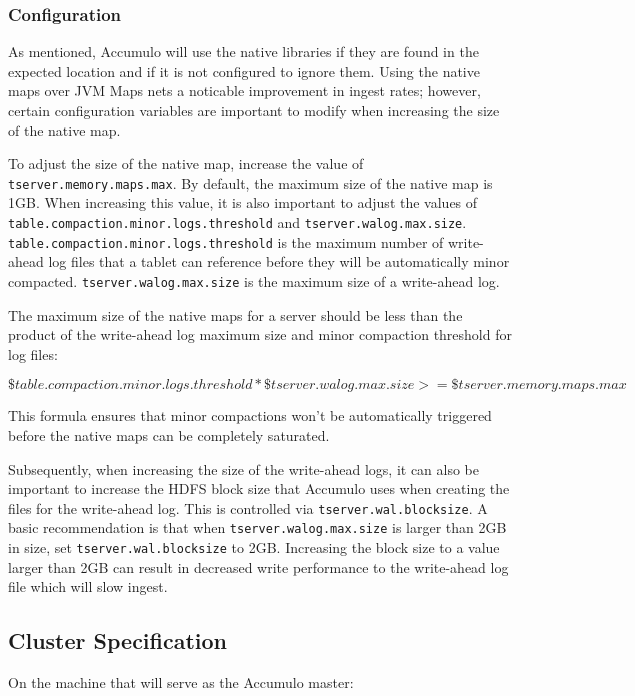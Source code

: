 \subsubsection{Configuration}

As mentioned, Accumulo will use the native libraries if they are found in the expected
location and if it is not configured to ignore them. Using the native maps over JVM
Maps nets a noticable improvement in ingest rates; however, certain configuration
variables are important to modify when increasing the size of the native map.

To adjust the size of the native map, increase the value of \texttt{tserver.memory.maps.max}.
By default, the maximum size of the native map is 1GB. When increasing this value, it is
also important to adjust the values of \texttt{table.compaction.minor.logs.threshold} and
\texttt{tserver.walog.max.size}. \texttt{table.compaction.minor.logs.threshold} is the maximum
number of write-ahead log files that a tablet can reference before they will be automatically
minor compacted. \texttt{tserver.walog.max.size} is the maximum size of a write-ahead log.

The maximum size of the native maps for a server should be less than the product
of the write-ahead log maximum size and minor compaction threshold for log files:

\(\$table.compaction.minor.logs.threshold * \$tserver.walog.max.size >= \$tserver.memory.maps.max\)

This formula ensures that minor compactions won't be automatically triggered before the native
maps can be completely saturated.

Subsequently, when increasing the size of the write-ahead logs, it can also be important
to increase the HDFS block size that Accumulo uses when creating the files for the write-ahead log.
This is controlled via \texttt{tserver.wal.blocksize}. A basic recommendation is that when
\texttt{tserver.walog.max.size} is larger than 2GB in size, set \texttt{tserver.wal.blocksize}
to 2GB. Increasing the block size to a value larger than 2GB can result in decreased write
performance to the write-ahead log file which will slow ingest.

\subsection{Cluster Specification}

On the machine that will serve as the Accumulo master:

